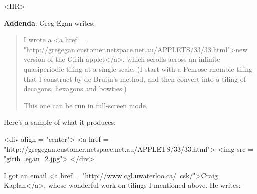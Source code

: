 <HR>

\textbf{Addenda}: Greg Egan writes:

\begin{quote}

I wrote a <a href = "http://gregegan.customer.netspace.net.au/APPLETS/33/33.html">new version of the Girih applet</a>, which scrolls across an infinite 
quasiperiodic tiling at a single scale.  (I start with a Penrose rhombic 
tiling that I construct by de Bruijn's method, and then convert into a 
tiling of decagons, hexagons and bowties.)


This one can be run in full-screen mode.

\end{quote}
    

Here's a sample of what it produces:

<div align = "center">
<a href = "http://gregegan.customer.netspace.net.au/APPLETS/33/33.html">
<img src = "girih_egan_2.jpg">
</div>

I got an email 
<a href = "http://www.cgl.uwaterloo.ca/~csk/">Craig Kaplan</a>, whose 
wonderful work on tilings I mentioned above.  He writes:

